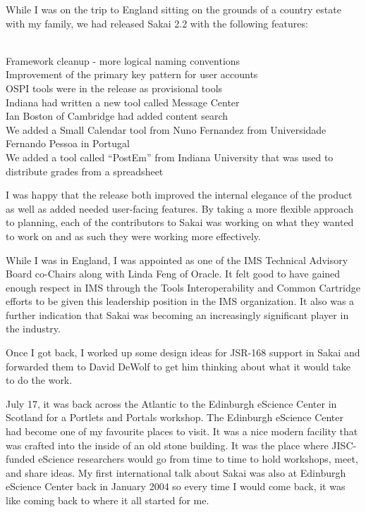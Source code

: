 \documentclass[12pt]{book}
\begin{document}
While I was on the trip to England sitting on the grounds of a country
estate with my family, we had released Sakai 2.2 with the following
features:\\
\\
\begin{sf}
Framework cleanup - more logical naming conventions\\
Improvement of the primary key pattern for user accounts\\
OSPI tools were in the release as provisional tools\\
Indiana had written a new tool called Message Center\\
Ian Boston of Cambridge had added content search\\
We added a Small Calendar tool from Nuno Fernandez from
  Universidade Fernando Pessoa in Portugal\\
We added a tool called ``PostEm'' from Indiana University
  that was used to distribute grades from a spreadsheet\\
\end{sf}

I was happy that the release both improved the internal elegance of the
product as well as added needed user-facing features.  By taking a more
flexible approach to planning, each of the contributors to Sakai was
working on what they wanted to work on and as such they were
working more effectively.

While I was in England, I was appointed as one of the IMS Technical
Advisory Board co-Chairs along with Linda Feng of Oracle.  It felt good
to have gained enough respect in IMS through the Tools Interoperability
and Common Cartridge efforts to be given this leadership position
in the IMS organization.  It also was a further indication that Sakai
was becoming an increasingly significant player in the industry.

Once I got back, I worked up some design ideas for JSR-168 support
in Sakai and forwarded them to David DeWolf to get him thinking about
what it would take to do the work.

July 17, it was back across the Atlantic to the Edinburgh eScience
Center in Scotland for a Portlets and Portals workshop.  The Edinburgh eScience
Center had become one of my favourite places to visit.  It was a nice modern
facility that was crafted into the inside of an old stone building.
It was the place where JISC-funded eScience researchers would
go from time to time to hold workshops, meet, and share ideas.
My first international talk about Sakai was also at Edinburgh eScience
Center back in January 2004 so every time I would come back, it was
like coming back to where it all started for me.
\end{document}
